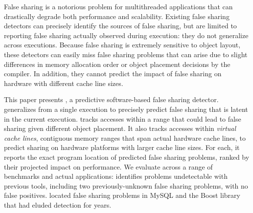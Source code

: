 

False sharing is a notorious problem for multithreaded applications
that can drastically degrade both performance and
scalability. Existing false sharing detectors can precisely identify
the sources of false sharing, but are limited to reporting false
sharing actually observed during execution: they do not generalize
across executions. Because false sharing is extremely sensitive to
object layout, these detectors can easily miss false sharing problems
that can arise due to slight differences in memory allocation order or
object placement decisions by the compiler. In addition, they cannot
predict the impact of false sharing on hardware with different cache
line sizes.


This paper presents \Predator{}, a predictive software-based false
sharing detector. \Predator{} generalizes from a single execution to
precisely predict false sharing that is latent in the current
execution. \predator{} tracks accesses within a range that could lead
to false sharing given different object placement. It also tracks
accesses within
\emph{virtual cache lines}, contiguous memory ranges that span actual
hardware cache lines, to predict sharing on hardware platforms with
larger cache line sizes. For each, it reports the exact program
location of predicted false sharing problems, ranked by their
projected impact on performance. We evaluate \Predator{} across a
range of benchmarks and actual applications: \Predator{} identifies
problems undetectable with previous tools, including two
previously-unknown false sharing problems, with no false
positives. \Predator{} located false sharing problems in MySQL and the
Boost library that had eluded detection for years.




